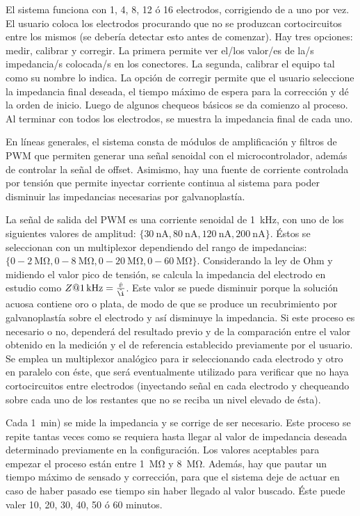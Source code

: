 El sistema funciona con 1, 4, 8, 12 ó 16 electrodos, corrigiendo de a uno por vez. El usuario coloca los electrodos procurando que no se produzcan cortocircuitos entre los mismos (se debería detectar esto antes de comenzar). Hay tres opciones: medir, calibrar y corregir. La primera permite ver el/los valor/es de la/s impedancia/s colocada/s en los conectores. La segunda, calibrar el equipo tal como su nombre lo indica. La opción de corregir permite que el usuario seleccione la impedancia final deseada, el tiempo máximo de espera para la corrección y dé la orden de inicio. Luego de algunos chequeos básicos se da comienzo al proceso. Al terminar con todos los electrodos, se muestra la impedancia final de cada uno. 

En líneas generales, el sistema consta de módulos de amplificación y filtros de PWM que permiten generar una señal senoidal con el microcontrolador, además de controlar la señal de offset. Asimismo, hay una fuente de corriente controlada por tensión que permite inyectar corriente continua al sistema para poder disminuir las impedancias necesarias por galvanoplastía. 

La señal de salida del PWM es una corriente senoidal de \SI{1}{\kilo\hertz}, con uno de los siguientes valores de amplitud: $\{\SI{30}{\nano\ampere}, \SI{80}{\nano\ampere}, \SI{120}{\nano\ampere}, \SI{200}{\nano\ampere}\}$. Éstos se seleccionan con un multiplexor dependiendo del rango de impedancias: $\{0-\SI{2}{\mega\ohm}, 0-\SI{8}{\mega\ohm}, 0-\SI{20}{\mega\ohm}, 0-\SI{60}{\mega\ohm}\}$. Considerando la ley de Ohm y midiendo el valor pico de tensión, se calcula la impedancia del electrodo en estudio como $Z@\SI{1}{\kilo\hertz} = \frac{\hat{v}}{\hat{\i}}$. Este valor se puede disminuir porque la solución acuosa contiene oro o plata, de modo de que se produce un recubrimiento por galvanoplastía sobre el electrodo y así disminuye la impedancia. Si este proceso es necesario o no, dependerá del resultado previo y de la comparación entre el valor obtenido en la medición y el de referencia establecido previamente por el usuario. Se emplea un multiplexor analógico para ir seleccionando cada electrodo y otro en paralelo con éste, que será eventualmente utilizado para verificar que no haya cortocircuitos entre electrodos (inyectando señal en cada electrodo y chequeando sobre cada uno de los restantes que no se reciba un nivel elevado de ésta). 

Cada \SI{1}{\minute}) se mide la impedancia y se corrige de ser necesario. Este proceso se repite tantas veces como se requiera hasta llegar al valor de impedancia deseada determinado previamente en la configuración. Los valores aceptables para empezar el proceso están entre \SI{1}{\mega\ohm} y \SI{8}{\mega\ohm}. Además, hay que pautar un tiempo máximo de sensado y corrección, para que el sistema deje de actuar en caso de haber pasado ese tiempo sin haber llegado al valor buscado. Éste puede valer 10, 20, 30, 40, 50 ó 60 minutos.

